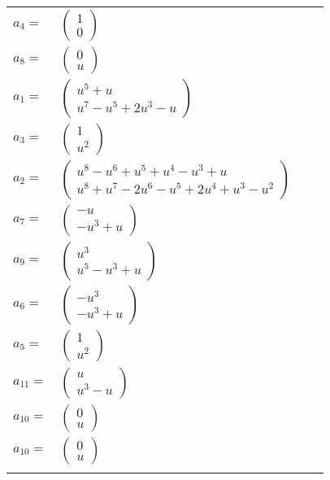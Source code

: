 \documentclass[1p]{elsarticle_modified}
\theoremstyle{definition}
\begin{document}
\begin{tabular}{m{7pt} m{180pt} m{7pt} m{180pt} }
\flushright $a_{4}=$&$\begin{pmatrix}1\\0\end{pmatrix}$ \\
\flushright $a_{8}=$&$\begin{pmatrix}0\\u\end{pmatrix}$ \\
\flushright $a_{1}=$&$\begin{pmatrix}u^5+u\\u^7- u^5+2 u^3- u\end{pmatrix}$ \\
\flushright $a_{3}=$&$\begin{pmatrix}1\\u^2\end{pmatrix}$ \\
\flushright $a_{2}=$&$\begin{pmatrix}u^8- u^6+u^5+u^4- u^3+u\\u^8+u^7-2 u^6- u^5+2 u^4+u^3- u^2\end{pmatrix}$ \\
\flushright $a_{7}=$&$\begin{pmatrix}- u\\- u^3+u\end{pmatrix}$ \\
\flushright $a_{9}=$&$\begin{pmatrix}u^3\\u^5- u^3+u\end{pmatrix}$ \\
\flushright $a_{6}=$&$\begin{pmatrix}- u^3\\- u^3+u\end{pmatrix}$ \\
\flushright $a_{5}=$&$\begin{pmatrix}1\\u^2\end{pmatrix}$ \\
\flushright $a_{11}=$&$\begin{pmatrix}u\\u^3- u\end{pmatrix}$ \\
\flushright $a_{10}=$&$\begin{pmatrix}0\\u\end{pmatrix}$\\ \flushright $a_{10}=$&$\begin{pmatrix}0\\u\end{pmatrix}$\\&\end{tabular}
\end{document}
